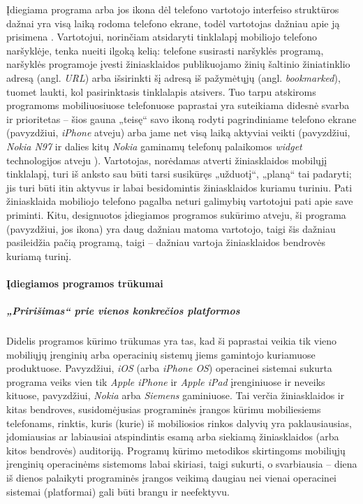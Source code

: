 \documentclass[kursinis-darbas]{vukf}
\begin{document}
Įdiegiama programa arba jos ikona dėl telefono vartotojo interfeiso struktūros dažnai yra visą laiką rodoma telefono ekrane, todėl vartotojas dažniau apie ją prisimena \cite{imediaconnection_secrets_behind_3_branded_iphone_app_successes}. Vartotojui, norinčiam atsidaryti tinklalapį mobiliojo telefono naršyklėje, tenka nueiti ilgoką kelią: telefone susirasti naršyklės programą, naršyklės programoje įvesti žiniasklaidos publikuojamo žinių šaltinio žiniatinklio adresą (angl. \emph{URL}) arba išsirinkti šį adresą iš pažymėtųjų (angl. \emph{bookmarked}), tuomet laukti, kol pasirinktasis tinklalapis atsivers. Tuo tarpu atskiroms programoms mobiliuosiuose telefonuose paprastai yra suteikiama didesnė svarba ir prioritetas – šios gauna „teisę“ savo ikoną rodyti pagrindiniame telefono ekrane (pavyzdžiui, \emph{iPhone} atveju) arba jame net visą laiką aktyviai veikti (pavyzdžiui, \emph{Nokia N97} ir dalies kitų \emph{Nokia} gaminamų telefonų palaikomos \emph{widget} technologijos atveju \cite{nokia_whats_the_latest_about_web_runtime_from_nokia}). Vartotojas, norėdamas atverti žiniasklaidos mobilųjį tinklalapį, turi iš anksto sau būti tarsi susikūręs „užduotį“, „planą“ tai padaryti; jis turi būti itin aktyvus ir labai besidomintis žiniasklaidos kuriamu turiniu. Pati žiniasklaida mobiliojo telefono pagalba neturi galimybių vartotojui pati apie save priminti. Kitu, designuotos įdiegiamos programos sukūrimo atveju, ši programa (pavyzdžiui, jos ikona) yra daug dažniau matoma vartotojo, taigi šis dažniau pasileidžia pačią programą, taigi – dažniau vartoja žiniasklaidos bendrovės kuriamą turinį.


\paragraph{Įdiegiamos programos trūkumai}

\subparagraph{„Pririšimas“ prie vienos konkrečios platformos}

Didelis programos kūrimo trūkumas yra tas, kad ši paprastai veikia tik vieno mobiliųjų įrenginių arba operacinių sistemų jiems gamintojo kuriamuose produktuose. Pavyzdžiui, \emph{iOS} (arba \emph{iPhone OS}) operacinei sistemai sukurta programa veiks vien tik \emph{Apple iPhone} ir \emph{Apple iPad} įrenginiuose ir neveiks kituose, pavyzdžiui, \emph{Nokia} arba \emph{Siemens} gaminiuose. Tai verčia žiniasklaidos ir kitas bendroves, susidomėjusias programinės įrangos kūrimu mobiliesiems telefonams, rinktis, kuris (kurie) iš mobiliosios rinkos dalyvių yra paklausiausias, įdomiausias ar labiausiai atspindintis esamą arba siekiamą žiniasklaidos (arba kitos bendrovės) auditoriją. Programų kūrimo metodikos skirtingoms mobiliųjų įrenginių operacinėms sistemoms labai skiriasi, taigi sukurti, o svarbiausia – diena iš dienos palaikyti programinės įrangos veikimą daugiau nei vienai operacinei sistemai (platformai) gali būti brangu ir neefektyvu.
\end{document}
